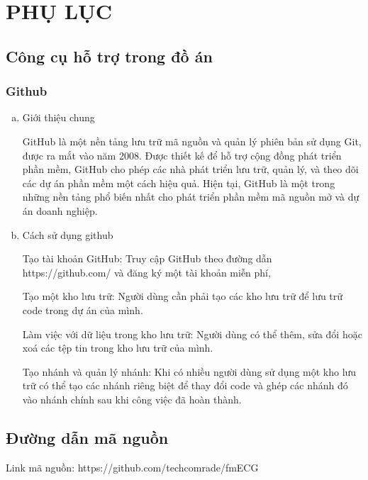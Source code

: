 
\section*{PHỤ LỤC}


\subsection*{Công cụ hỗ trợ trong đồ án}

\subsubsection*{Github}

\begin{enumerate}[a)]
  \item Giới thiệu chung
  
  GitHub là một nền tảng lưu trữ mã nguồn và quản lý phiên bản sử dụng Git, được ra mắt vào năm 2008. Được thiết kế để hỗ trợ cộng đồng phát triển phần mềm, GitHub cho phép các nhà phát triển lưu trữ, quản lý, và theo dõi các dự án phần mềm một cách hiệu quả. Hiện tại, GitHub là một trong những nền tảng phổ biến nhất cho phát triển phần mềm mã nguồn mở và dự án doanh nghiệp.\cite{github}
  
  \item Cách sử dụng github
  
  Tạo tài khoản GitHub: Truy cập GitHub theo đường dẫn https://github.com/ và đăng ký một tài khoản miễn phí, 

Tạo một kho lưu trữ: Người dùng cần phải tạo các kho lưu trữ để lưu trữ code trong dự án của mình.

Làm việc với dữ liệu trong kho lưu trữ: Người dùng có thể thêm, sửa đổi hoặc xoá các tệp tin trong kho lưu trữ của mình.

Tạo nhánh và quản lý nhánh: Khi có nhiều người dùng sử dụng một kho lưu trữ có thể tạo các nhánh riêng biệt để thay đổi code và ghép các nhánh đó vào nhánh chính sau khi công việc đã hoàn thành.
\end{enumerate}

\subsection*{Đường dẫn mã nguồn}

Link mã nguồn: https://github.com/techcomrade/fmECG

\clearpage